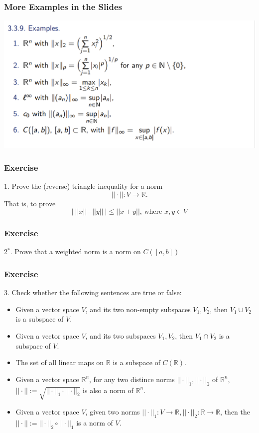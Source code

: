 \documentclass{beamer}
\begin{document}
\begin{frame}
    \frametitle{More Examples in the Slides}
    \centering
    \includegraphics[width=1\textwidth]{example.png}

\end{frame}
\begin{frame}
    \frametitle{Exercise}
    1. Prove the (reverse) triangle inequality for a norm
    \begin{equation*}
        ||\cdot||:V\rightarrow \mathbb{R}.
    \end{equation*}
    That is, to prove
    \begin{equation*}
        |\ ||x||-||y||\ |\leq ||x\pm y||\text{, where }x,y\in V
    \end{equation*}
\end{frame}
\begin{frame}
    \frametitle{Exercise}
    2$^*$. Prove that a weighted norm is a norm
    on $C([a,b])$
\end{frame}
\begin{frame}
    \frametitle{Exercise}
    3. Check whether the following sentences are true or false:
    \begin{itemize}
        \item Given a vector space $V$, and its two non-empty subspaces $V_1, V_2$, then $V_1\cup V_2$ is a subspace of $V$.
        \item Given a vector space $V$, and its two subspaces $V_1,V_2$, then $V_1\cap V_2$ is a subspace of $V$.
        \item The set of all linear maps on $\mathbb{R}$ is a subspace of $C(\mathbb{R})$.
        \item Given a vector space $\mathbb{R}^n$, for any two distince norms $||\cdot||_1, ||\cdot||_2$ of $\mathbb{R}^n$, $||\cdot||:=\sqrt{||\cdot||_1\cdot||\cdot||_2}$ is also a norm of $\mathbb{R}^n$.
        \item Given a vector space $V$, given two norms $||\cdot||_1:V\rightarrow\mathbb{R}, ||\cdot||_2:\mathbb{R}\rightarrow\mathbb{R}$, then the $||\cdot||:=||\cdot||_2\circ||\cdot||_1$ is a norm of $V$.
    \end{itemize}
\end{frame}
\end{document}
